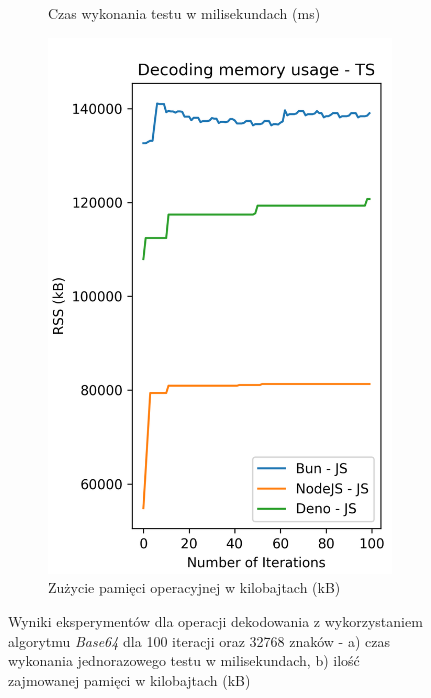 \begin{figure}[H]
\begin{subfigure}[b]{0.42\textwidth}
    \caption{Czas wykonania testu w milisekundach (ms)}
    \label{fig:decoding_e1_js_time}
  \end{subfigure}
  \begin{subfigure}[b]{0.42\textwidth}
    \centering
    \includegraphics[width=\textwidth]{Figures/coding/base64_100_decoding_js_memory.png}
    \caption{Zużycie pamięci operacyjnej w kilobajtach (kB)}
    \label{fig:decoding_e1_js_memory}
  \end{subfigure}
  \hfill
  \caption{Wyniki eksperymentów dla operacji dekodowania z wykorzystaniem algorytmu \textit{Base64} dla 100 iteracji oraz 32768 znaków - a) czas wykonania jednorazowego testu w milisekundach, b) ilość zajmowanej pamięci w kilobajtach (kB)}
  \label{fig:decoding_e1_js}
\end{figure}

